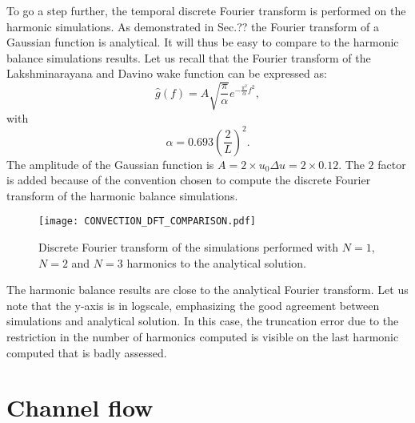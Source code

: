 To go a step further, the temporal discrete Fourier transform is performed
on the harmonic simulations. As demonstrated in Sec.??
the Fourier transform of a Gaussian function is analytical. It will thus 
be easy to compare to the harmonic balance simulations results.
Let us recall that the Fourier transform of the Lakshminarayana and Davino
wake function can be expressed as:
\begin{equation}
    \widehat{g}(f) = A \sqrt{\frac{\pi}{\alpha}} e^{-\frac{\pi^2}{\alpha} f^2},
\end{equation}
with
\begin{equation}
    \alpha =  0.693 \left( \frac{2}{L} \right)^2.
\end{equation}
The amplitude of the Gaussian function is $A=2 \times u_0 \Delta u = 2 \times 0.12$.
The $2$ factor is added because of the convention chosen
to compute the discrete Fourier transform of the harmonic balance simulations.
\begin{figure}[htbp]
  \begin{center}
    \texttt{[image: CONVECTION\_DFT\_COMPARISON.pdf]}
  \end{center}
  \caption{Discrete Fourier transform of the simulations performed with $N=1$, 
  $N=2$ and $N=3$ harmonics to the analytical solution.}
  \label{fig:convection_dft_comparison}
\end{figure}
The harmonic balance results are close to the analytical Fourier transform.
Let us note that the y-axis is in logscale, emphasizing the good
agreement between simulations and analytical solution.
In this case, the truncation error due to the restriction in the 
number of harmonics computed is visible on the last harmonic computed
that is badly assessed.




\section{Channel flow}
\label{sec:channel-flow}

